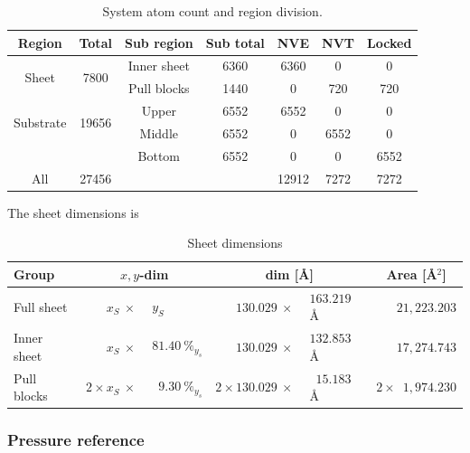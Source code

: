 \begin{table}[H]
  \begin{center}
  \caption{System atom count and region division.}
  \label{tab:system_count}
  \begin{tabular}{ |c|| c | c | c | c | c | c |} \hline
    \textbf{Region} & \textbf{Total}  & Sub region & Sub total & \textbf{NVE} & \textbf{NVT} & \textbf{Locked} \\ \hline   
    \multirow{2}{*}{Sheet} & \multirow{2}{*}{7800} & Inner sheet & 6360 & 6360 & 0 & 0 \\ %
    & & Pull blocks & 1440 & 0 & 720 & 720 \\ \hline   
    \multirow{2}{*}{Substrate} & \multirow{2}{*}{19656} & Upper & 6552 & 6552 & 0 & 0 \\ %
    & & Middle & 6552 & 0 & 6552 & 0 \\ %
    & & Bottom & 6552 & 0 & 0 & 6552 \\ \hline \hline   
    All & 27456 & \multicolumn{2}{r|}{} & 12912 & 7272 & 7272 \\ \hline 
  \end{tabular}
  \end{center}
\end{table}


The sheet dimensions is 
\begin{table}[H]
  \begin{center}
  \caption{Sheet dimensions}
  \label{tab:}
  \begin{tabular}{ | l | r@{}l | r@{}l | c |} \hline
    \textbf{Group} & \multicolumn{2}{c|}{$x,y$-dim} & \multicolumn{2}{c|}{dim [Å]} & Area [Å$^2$]\\ \hline
  Full sheet & $x_S \: \times \: $ & $y_S$ &  $130.029 \: \times \:$ & $163.219$ Å & $\phantom{2\times} 21,223.203$ \\ \hline
  Inner sheet & $x_S \: \times \:$ & $81.40 \ \%_{y_s}$ &  $130.029  \: \times \:$ & $132.853$ Å & $\phantom{2\times} 17,274.743$\\ \hline
  Pull blocks & $2 \times x_S \: \times \:$ & $ \phantom{0}9.30 \ \%_{y_s}$ & $2 \times 130.029  \: \times \: $ & $\phantom{0}15.183$ Å  & $2 \times \phantom{0}1,974.230$ \\ \hline  
  \end{tabular}
  \end{center}
\end{table}


\subsubsection{Pressure reference}

